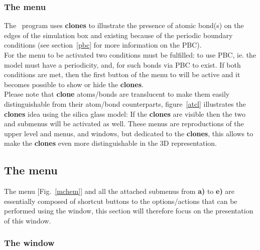 \subsubsection{The  menu}
\label{Clones}

The \atomes\ program uses {\bf{clones}} to illustrate the presence of atomic bond(s) on the edges of the simulation box and 
existing because of the periodic boundary conditions (see section~\ref{pbc} for more information on the PBC). \\ 
For the  menu to be activated two conditions must be fulfilled: to use PBC, ie. the model must have a periodicity, and, for such bonds via PBC to exist. 
If both conditions are met, then the first button of the menu to  will be active and it becomes possible to show or hide the {\bf{clones}}. \\ 
Please note that {\bf{clone}} atoms/bonds are translucent to make them easily distinguishable from their atom/bond counterparts, 
figure~\ref{atcl} illustrates the {\bf{clones}} idea using the silica glass model:
\clonefig
\laf If the {\bf{clones}} are visible then the two  and  submenus will be activated as well.
These menus are reproductions of the upper level  and  menus, and windows, but dedicated to the {\bf{clones}}, 
this allows to make the {\bf{clones}} even more distinguishable in the 3D representation. 

\clearpage

\subsection{The  menu}
\label{chemm}

\vspace{-0.5cm}
\mchemfig

The  menu [Fig.~\ref{mchem}] and all the attached submenus from {\bf{a)}} to {\bf{e)}} are essentially composed of shortcut buttons to the options/actions that can be performed using the  window, this section will therefore focus on the presentation of this window. 

\subsubsection*{The  window}
\label{ecw}

